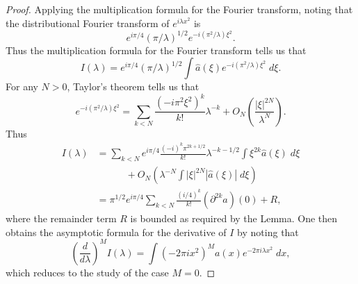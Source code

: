 %
%
%
%
%
\begin{proof}
  Applying the multiplication formula for the Fourier transform, noting that the distributional Fourier transform of $e^{i \lambda x^2}$ is
  \[ e^{i \pi / 4} (\pi / \lambda)^{1/2} e^{- i (\pi^2 / \lambda) \xi^2}. \]
  Thus the multiplication formula for the Fourier transform tells us that
  \[ I(\lambda) = e^{i \pi / 4} (\pi / \lambda)^{1/2} \int \widehat{a}(\xi) e^{-i (\pi^2 / \lambda) \xi^2}\; d\xi. \]
  For any $N > 0$, Taylor's theorem tells us that
  \[ e^{-i (\pi^2 / \lambda) \xi^2} = \sum_{k < N} \frac{(-i \pi^2 \xi^2)^k}{k!} \lambda^{-k} + O_N \left( \frac{|\xi|^{2N}}{\lambda^{N}} \right). \]
  Thus
  \begin{align*}
    I(\lambda) &= \sum_{k < N} e^{i \pi / 4} \frac{(-i)^k \pi^{2k+1/2}}{k!} \lambda^{-k-1/2} \int \xi^{2k} \widehat{a}(\xi)\; d\xi\\
    &\quad\quad\quad + O_N \left( \lambda^{-N} \int |\xi|^{2N} |\widehat{a}(\xi)|\; d\xi \right)\\
    &= \pi^{1/2} e^{i \pi / 4} \sum_{k < N} \frac{(i/4)^k}{k!} (\partial^{2k} a)(0) + R,
  \end{align*}
  where the remainder term $R$ is bounded as required by the Lemma. One then obtains the asymptotic formula for the derivative of $I$ by noting that
  \[ \left( \frac{d}{d\lambda} \right)^M I(\lambda) = \int (-2 \pi i x^2)^M a(x) e^{-2 \pi i \lambda x^2}\; dx, \]
  which reduces to the study of the case $M = 0$.
\end{proof}

